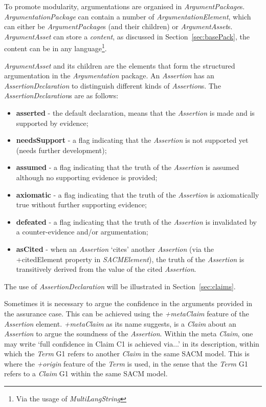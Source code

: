To promote modularity, argumentations are organised in \textit{ArgumentPackage}s. 
\textit{ArgumentationPackage} can contain a number of \textit{ArgumentationElement}, which can either be \textit{ArgumentPackage}s (and their children) or \textit{ArgumentAsset}s. 
\textit{ArgumentAsset} can store a \textit{content}, as discussed in Section~\ref{sec:basePack}, the content can be in any language\footnote{Via the usage of \textit{MultiLangString}}.

\textit{ArgumentAsset} and its children are the elements that form the structured argumentation in the \textit{Argumentation} package. 
An \textit{Assertion} has an \textit{AssertionDeclaration} to distinguish different kinds of \textit{Assertion}s. 
The \textit{AssertionDeclaration}s are as follows: 

\begin{itemize}
	\item \textbf{asserted} - the default declaration, means that the \textit{Assertion} is made and is supported by evidence;
	\item \textbf{needsSupport} - a flag indicating that the \textit{Assertion} is not supported yet (needs further development);
	\item \textbf{assumed} - a flag indicating that the truth of the \textit{Assertion} is assumed although no supporting evidence is provided;
	\item \textbf{axiomatic} - a flag indicating that the truth of the \textit{Assertion} is axiomatically true without further supporting evidence;
	\item \textbf{defeated} - a flag indicating that the truth of the \textit{Assertion} is invalidated by a counter-evidence and/or argumentation;
	\item \textbf{asCited} - when an \textit{Assertion} `cites' another \textit{Assertion} (via the +citedElement property in \textit{SACMElement}), the truth of the \textit{Assertion} is transitively derived from the value of the cited \textit{Assertion}.
\end{itemize}

The use of \textit{AssertionDeclaration} will be illustrated in Section~\ref{sec:claims}.

Sometimes it is necessary to argue the confidence in the arguments provided in the assurance case. 
This can be achieved using the \textit{+metaClaim} feature of the \textit{Assertion} element. 
\textit{+metaClaim} as its name suggests, is a \textit{Claim} about an \textit{Assertion} to argue the soundness of the \textit{Assertion}. 
Within the meta \textit{Claim}, one may write `full confidence in Claim C1 is achieved via...' in its description, within which the \textit{Term} G1 refers to another \textit{Claim} in the same SACM model. 
This is where the \textit{+origin} feature of the \textit{Term} is used, in the sense that the \textit{Term} G1 refers to a \textit{Claim} G1 within the same SACM model.

